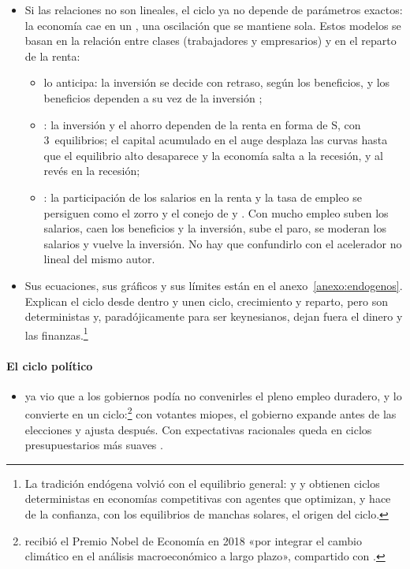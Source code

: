 \documentclass[11pt]{article}
\begin{document}
\begin{itemize}
\item Si las relaciones no son lineales, el ciclo ya no depende de parámetros exactos: la economía cae en un , una oscilación que se mantiene sola. Estos modelos se basan en la relación entre clases (trabajadores y empresarios) y en el reparto de la renta:
  \begin{itemize}
  \item {} lo anticipa: la inversión se decide con retraso, según los beneficios, y los beneficios dependen a su vez de la inversión\nocite{Kalecki1933Proba,Kalecki1935Macrodynamic} ;
  \item \textcite{Kaldor1940Model}: la inversión y el ahorro dependen de la renta en forma de S, con 3~equilibrios; el capital acumulado en el auge desplaza las curvas hasta que el equilibrio alto desaparece y la economía salta a la recesión, y al revés en la recesión;
  \item \textcite{Goodwin1967Growth}: la participación de los salarios en la renta y la tasa de empleo se persiguen como el zorro y el conejo de  y . Con mucho empleo suben los salarios, caen los beneficios y la inversión, sube el paro, se moderan los salarios y vuelve la inversión. No hay que confundirlo con el acelerador no lineal del mismo autor\nocite{Goodwin1951Nonlinear}.
  \end{itemize}
\item Sus ecuaciones, sus gráficos y sus límites están en el anexo~\ref{anexo:endogenos}. Explican el ciclo desde dentro y unen ciclo, crecimiento y reparto, pero son deterministas y, paradójicamente para ser keynesianos, dejan fuera el dinero y las finanzas.\footnote{La tradición endógena volvió con el equilibrio general:  y \nocite{BenhabibNishimura1979Hopf,BenhabibNishimura1985Competitive} y \textcite{Grandmont1985Endogenous} obtienen ciclos deterministas en economías competitivas con agentes que optimizan, y \textcite{Farmer2010Expectations} hace de la confianza, con los equilibrios de manchas solares, el origen del ciclo.}
\end{itemize}

\paragraph{El ciclo político}

\begin{itemize}
\item \textcite{Kalecki1943Political} ya vio que a los gobiernos podía no convenirles el pleno empleo duradero, y \textcite{Nordhaus1975Political} lo convierte en un ciclo:\footnote{ recibió el Premio Nobel de Economía en 2018 «por integrar el cambio climático en el análisis macroeconómico a largo plazo», compartido con \nocite{Nobel2018Nordhaus}.} con votantes miopes, el gobierno expande antes de las elecciones y ajusta después. Con expectativas racionales queda en ciclos presupuestarios más suaves\nocite{Rogoff1990Equilibrium} .
\end{itemize}
\end{document}
